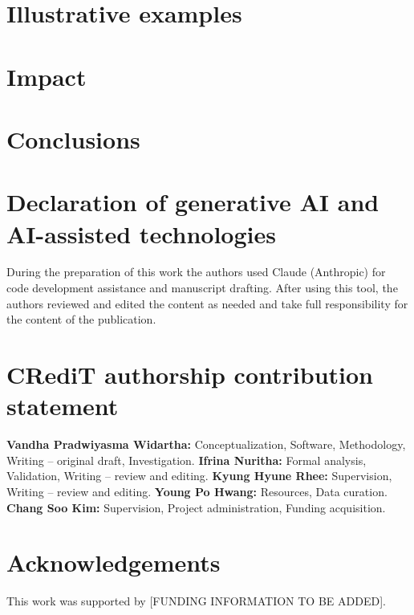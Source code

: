 \documentclass[preprint,12pt, a4paper]{elsarticle}
\begin{document}
\section{Illustrative examples}

\section{Impact}

\section{Conclusions}

\section*{Declaration of generative AI and AI-assisted technologies}
During the preparation of this work the authors used Claude (Anthropic) for code development assistance and manuscript drafting. After using this tool, the authors reviewed and edited the content as needed and take full responsibility for the content of the publication.

\section*{CRediT authorship contribution statement}
\textbf{Vandha Pradwiyasma Widartha:} Conceptualization, Software, Methodology, Writing -- original draft, Investigation. \textbf{Ifrina Nuritha:} Formal analysis, Validation, Writing -- review and editing. \textbf{Kyung Hyune Rhee:} Supervision, Writing -- review and editing. \textbf{Young Po Hwang:} Resources, Data curation. \textbf{Chang Soo Kim:} Supervision, Project administration, Funding acquisition.

\section*{Acknowledgements}
This work was supported by [FUNDING INFORMATION TO BE ADDED].


\end{document}

